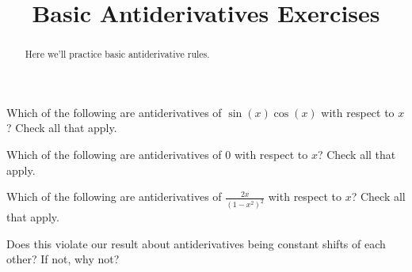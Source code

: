 \documentclass[handout]{ximera}
\title{Basic Antiderivatives Exercises}
\begin{document}
\begin{abstract}
  Here we'll practice basic antiderivative rules.
\end{abstract}
\maketitle

\begin{exercise}
Which of the following are antiderivatives of $\sin(x)\cos(x)$ with respect to $x$?  Check all that apply.

\begin{selectAll}
\end{selectAll}



\end{exercise}

\begin{exercise}
Which of the following are antiderivatives of $0$ with respect to $x$?  Check all that apply.

\begin{selectAll}
\end{selectAll}



\end{exercise}


\begin{exercise}
Which of the following are antiderivatives of $\frac{2x}{(1-x^2)^2}$ with respect to $x$?  Check all that apply.

\begin{selectAll}
\end{selectAll}

Does this violate our result about antiderivatives being constant shifts of each other?  If not, why not?

\end{exercise}
\end{document}
